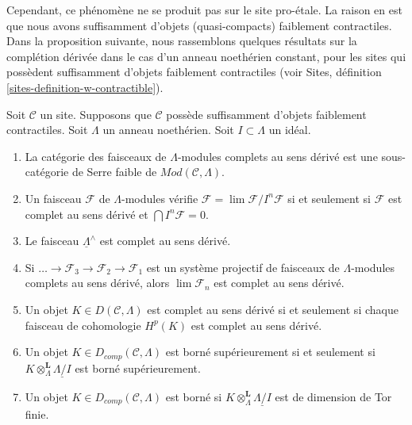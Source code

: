 \medskip\noindent
Cependant, ce phénomène ne se produit pas sur le site pro-\'etale.
La raison en est que nous avons suffisamment d'objets (quasi-compacts) faiblement contractiles.
Dans la proposition suivante, nous rassemblons quelques résultats sur la
complétion dérivée dans le cas d'un anneau noethérien constant, pour les sites qui possèdent suffisamment
d'objets faiblement contractiles (voir
Sites, définition \ref{sites-definition-w-contractible}).

\begin{proposition}
\label{proposition-enough-weakly-contractibles}
Soit $\mathcal{C}$ un site. Supposons que $\mathcal{C}$ possède suffisamment
d'objets faiblement contractiles.
Soit $\Lambda$ un anneau noethérien. Soit $I \subset \Lambda$ un idéal.
\begin{enumerate}
\item La catégorie des faisceaux de $\Lambda$-modules complets au sens dérivé est une
sous-catégorie de Serre faible de $\textit{Mod}(\mathcal{C}, \Lambda)$.
\item Un faisceau $\mathcal{F}$ de $\Lambda$-modules vérifie
$\mathcal{F} = \lim \mathcal{F}/I^n\mathcal{F}$ si et seulement si
$\mathcal{F}$ est complet au sens dérivé et $\bigcap I^n\mathcal{F} = 0$.
\item Le faisceau $\underline{\Lambda}^\wedge$ est complet au sens dérivé.
\item Si $\ldots \to \mathcal{F}_3 \to \mathcal{F}_2 \to \mathcal{F}_1$
est un système projectif de faisceaux de $\Lambda$-modules complets au sens dérivé,
alors $\lim \mathcal{F}_n$ est complet au sens dérivé.
\item Un objet $K \in D(\mathcal{C}, \Lambda)$ est complet au sens dérivé si
et seulement si chaque faisceau de cohomologie $H^p(K)$ est complet au sens dérivé.
\item Un objet $K \in D_{comp}(\mathcal{C}, \Lambda)$ est borné supérieurement
si et seulement si $K \otimes_\Lambda^\mathbf{L} \underline{\Lambda/I}$
est borné supérieurement.
\item Un objet $K \in D_{comp}(\mathcal{C}, \Lambda)$ est borné
si $K \otimes_\Lambda^\mathbf{L} \underline{\Lambda/I}$ est de dimension de
Tor finie.
\end{enumerate}
\end{proposition}

